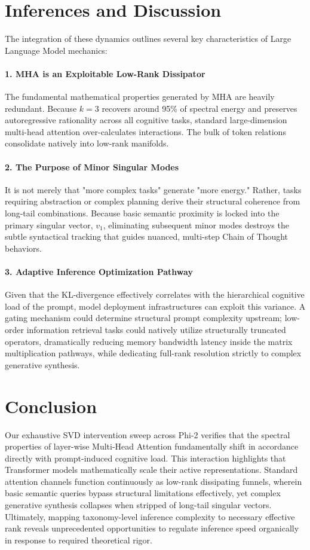 \documentclass{article}
\begin{document}
\section{Inferences and Discussion}

The integration of these dynamics outlines several key characteristics of Large Language Model mechanics:

\paragraph{1. MHA is an Exploitable Low-Rank Dissipator}
The fundamental mathematical properties generated by MHA are heavily redundant. Because $k=3$ recovers around 95\% of spectral energy and preserves autoregressive rationality across all cognitive tasks, standard large-dimension multi-head attention over-calculates interactions. The bulk of token relations consolidate natively into low-rank manifolds.

\paragraph{2. The Purpose of Minor Singular Modes}
It is not merely that "more complex tasks" generate "more energy." Rather, tasks requiring abstraction or complex planning derive their structural coherence from long-tail combinations. Because basic semantic proximity is locked into the primary singular vector, $v_1$, eliminating subsequent minor modes destroys the subtle syntactical tracking that guides nuanced, multi-step Chain of Thought behaviors. 

\paragraph{3. Adaptive Inference Optimization Pathway}
Given that the KL-divergence effectively correlates with the hierarchical cognitive load of the prompt, model deployment infrastructures can exploit this variance. A gating mechanism could determine structural prompt complexity upstream; low-order information retrieval tasks could natively utilize structurally truncated operators, dramatically reducing memory bandwidth latency inside the matrix multiplication pathways, while dedicating full-rank resolution strictly to complex generative synthesis.

\section{Conclusion}

Our exhaustive SVD intervention sweep across Phi-2 verifies that the spectral properties of layer-wise Multi-Head Attention fundamentally shift in accordance directly with prompt-induced cognitive load. This interaction highlights that Transformer models mathematically scale their active representations. Standard attention channels function continuously as low-rank dissipating funnels, wherein basic semantic queries bypass structural limitations effectively, yet complex generative synthesis collapses when stripped of long-tail singular vectors. Ultimately, mapping taxonomy-level inference complexity to necessary effective rank reveals unprecedented opportunities to regulate inference speed organically in response to required theoretical rigor.
\end{document}
